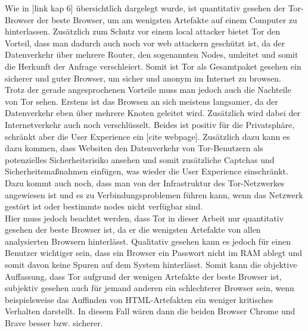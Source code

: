 Wie in [link kap 6] übersichtlich dargelegt wurde, ist quantitativ gesehen der Tor-Browser der beste Browser, um am wenigsten Artefakte auf einem Computer zu hinterlassen. Zusätzlich zum Schutz vor einem local attacker bietet Tor den Vorteil, dass man dadurch auch noch vor web attackern geschützt ist, da der Datenverkehr über mehrere Router, den sogenannten Nodes, umleitet und somit die Herkunft der Anfrage verschleiert. Somit ist Tor als Gesamtpaket gesehen ein sicherer und guter Browser, um sicher und anonym im Internet zu browsen. \\
Trotz der gerade angesprochenen Vorteile muss man jedoch auch die Nachteile von Tor sehen. Erstens ist das Browsen an sich meistens langsamer, da der Datenverkehr eben über mehrere Knoten geleitet wird. Zusätzlich wird dabei der Internetverkehr auch noch verschlüsselt. Beides ist positiv für die Privatsphäre, schränkt aber die User Experience ein [cite webpage]. Zusätzlich dazu kann es dazu kommen, dass Websiten den Datenverkehr von Tor-Benutzern als potenzielles Sicherheitsrisiko ansehen und somit zusätzliche Captchas und Sicherheitsmaßnahmen einfügen, was wieder die User Experience einschränkt. Dazu kommt auch noch, dass man von der Infrastruktur des Tor-Netzwerkes angewiesen ist und es zu Verbindungsproblemen führen kann, wenn das Netzwerk gestört ist oder bestimmte nodes nicht verfügbar sind. \\
Hier muss jedoch beachtet werden, dass Tor in dieser Arbeit nur quantitativ gesehen der beste Browser ist, da er die wenigsten Artefakte von allen analysierten Browsern hinterlässt. Qualitativ gesehen kann es jedoch für einen Benutzer wichtiger sein, dass ein Browser ein Passwort nicht im RAM ablegt und somit davon keine Spuren  auf dem System hinterlässt. Somit kann die objektive Auffassung, dass Tor aufgrund der wenigen Artefakte der beste Browser ist, subjektiv gesehen auch für jemand anderen ein schlechterer Browser sein, wenn beispielsweise das Auffinden von HTML-Artefakten ein weniger kritisches Verhalten darstellt. In diesem Fall wären dann die beiden Browser Chrome und Brave \glqq{}besser\grqq{} bzw. \glqq{}sicherer\grqq{}.

